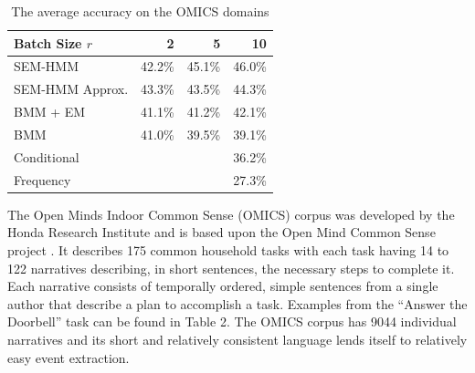 \documentclass[letterpaper]{article}
\begin{document}
\begin{table}
\footnotesize
\begin{center}
\begin{tabular}{|l|r|r|r|}
\hline
Batch Size $r$ & 2 & 5 & 10\\
\hline
SEM-HMM & 42.2\% & 45.1\% & 46.0\%\\
SEM-HMM Approx.& 43.3\% & 43.5\% & 44.3\%\\
BMM + EM & 41.1\% & 41.2\% & 42.1\%\\
BMM & 41.0\% & 39.5\% & 39.1\%\\
\hline
Conditional & \multicolumn{3}{r|}{36.2\%}\\
Frequency & \multicolumn{3}{r|}{27.3\%}\\
\hline
\end{tabular}
\caption{The average accuracy on the OMICS domains}
\end{center}
\label{table:omics}
\end{table}

\vspace{-3.05mm}
The Open Minds Indoor Common Sense (OMICS) corpus was developed by the Honda Research Institute and is based upon the Open Mind Common Sense project \cite{gupta2004common}. It describes 175 common household tasks with each task having 14 to 122 narratives describing, in short sentences, the necessary steps to complete it.  Each narrative consists of temporally ordered, simple sentences from a single author that describe a plan to accomplish a task.  Examples from the ``Answer the Doorbell'' task can be found in Table 2. The OMICS corpus has 9044 individual narratives and its short and relatively consistent language lends itself to relatively easy event extraction. %
\end{document}

